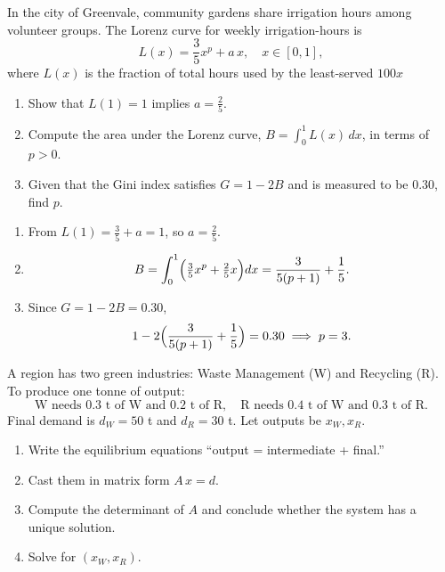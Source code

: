 \documentclass[11pt]{exam}
\begin{document}
\begin{questions}

\question[3]
In the city of Greenvale, community gardens share irrigation hours among volunteer groups.  The Lorenz curve for weekly irrigation-hours is
\[
L(x)=\frac{3}{5}x^p + a\,x,\quad x\in[0,1],
\]
where \(L(x)\) is the fraction of total hours used by the least‑served \(100x\)%
\begin{enumerate}[leftmargin=0.5cm,label=(\alph*),rightmargin=0.2cm]
  \item Show that \(L(1)=1\) implies \(a=\tfrac{2}{5}\).
  \item Compute the area under the Lorenz curve, \(B=\int_0^1L(x)\,dx\), in terms of \(p > 0\).
  \item Given that the Gini index satisfies \(G=1-2B\) and is measured to be \(0.30\), find \(p\).
\end{enumerate}

\begin{solution}
\begin{enumerate}[label=(\alph*)]
  \item From \(L(1)=\tfrac35 + a=1\), so \(a=\tfrac25\).
  \item 
  \[ 
    B=\int_0^1\Bigl(\tfrac35x^p + \tfrac25x\Bigr)dx
    =\frac{3}{5(p+1)} + \frac{1}{5}.
  \]
  \item Since \(G=1-2B=0.30\),
  \[
    1-2\Bigl(\frac{3}{5(p+1)} + \frac{1}{5}\Bigr)=0.30
    \;\Longrightarrow\;
    p=3.
  \]
\end{enumerate}
\end{solution}

\question[3]
A region has two green industries: Waste Management (W) and Recycling (R).  To produce one tonne of output:
\[
\text{W needs }0.3\text{ t of W and }0.2\text{ t of R},\quad
\text{R needs }0.4\text{ t of W and }0.3\text{ t of R}.
\]
Final demand is \(d_W=50\) t and \(d_R=30\) t.  Let outputs be \(x_W,x_R\).
\begin{enumerate}[leftmargin=0.5cm,label=(\alph*),rightmargin=0.2cm]
  \item Write the equilibrium equations “output = intermediate + final.”
  \item Cast them in matrix form \(A\,x=d\).
  \item Compute the determinant of \(A\) and conclude whether the system has a unique solution.
  \item Solve for \((x_W,x_R)\).
\end{enumerate}


\end{questions}
\end{document}
